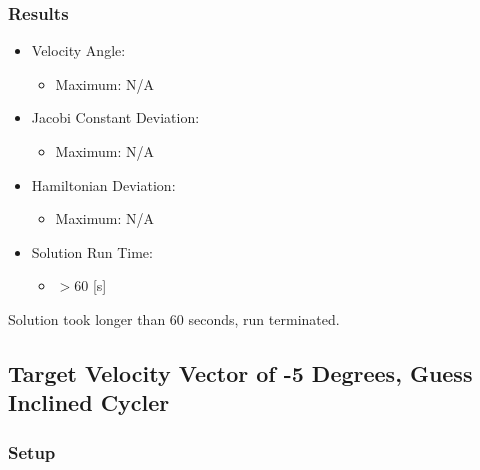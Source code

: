 \documentclass{article}
\begin{document}
\subsubsection{Results}

\begin{itemize}
    \item Velocity Angle:
    \begin{itemize}
        \item Maximum: N/A
    \end{itemize}
    \item Jacobi Constant Deviation:
    \begin{itemize}
        \item Maximum: N/A
    \end{itemize}
    \item Hamiltonian Deviation:
    \begin{itemize}
        \item Maximum: N/A
    \end{itemize}
    \item Solution Run Time:
    \begin{itemize}
        \item $>$60 [s]
    \end{itemize}  
\end{itemize}

Solution took longer than 60 seconds, run terminated.

\newpage

\subsection{Target Velocity Vector of -5 Degrees, Guess Inclined Cycler}

\subsubsection{Setup}
\end{document}
